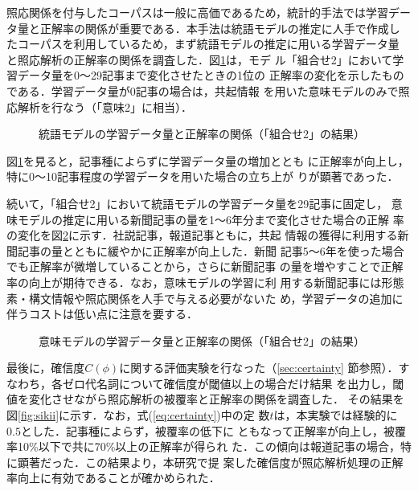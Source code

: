 照応関係を付与したコーパスは一般に高価であるため，統計的手法では学習デー
タ量と正解率の関係が重要である．本手法は統語モデルの推定に人手で作成し
たコーパスを利用しているため，まず統語モデルの推定に用いる学習データ量
と照応解析の正解率の関係を調査した．\mbox{図\ref{fig:shasetu}}は，モデ
ル「組合せ2」において学習データ量を0〜29記事まで変化させたときの1位の
正解率の変化を示したものである．学習データ量が0記事の場合は，共起情報
を用いた意味モデルのみで照応解析を行なう（「意味2」に相当）．

\begin{figure}[htbp]
\begin{center}
  \caption{統語モデルの学習データ量と正解率の関係（「組合せ2」の結果）}
  \label{fig:shasetu}
\end{center}
\end{figure}

図\ref{fig:shasetu}を見ると，記事種によらずに学習データ量の増加ととも
に正解率が向上し，特に0〜10記事程度の学習データを用いた場合の立ち上が
りが顕著であった．

続いて，「組合せ2」において統語モデルの学習データ量を29記事に固定し，
意味モデルの推定に用いる新聞記事の量を1〜6年分まで変化させた場合の正解
率の変化を図\ref{fig:shasetu.k}に示す．社説記事，報道記事ともに，共起
情報の獲得に利用する新聞記事の量とともに緩やかに正解率が向上した．新聞
記事5〜6年を使った場合でも正解率が微増していることから，さらに新聞記事
の量を増やすことで正解率の向上が期待できる．なお，意味モデルの学習に利
用する新聞記事には形態素・構文情報や照応関係を人手で与える必要がないた
め，学習データの追加に伴うコストは低い点に注意を要する．

\begin{figure}[htbp]
\begin{center}
\caption{意味モデルの学習データ量と正解率の関係（「組合せ2」の結果）}
\label{fig:shasetu.k}
\end{center}
\end{figure}


最後に，確信度$C(\phi)$に関する評価実験を行なった（\ref{sec:certainty}
節参照）．すなわち，各ゼロ代名詞について確信度が閾値以上の場合だけ結果
を出力し，閾値を変化させながら照応解析の被覆率と正解率の関係を調査した．
その結果を図\ref{fig:sikii}に示す．なお，式(\ref{eq:certainty})中の定
数$t$は，本実験では経験的に$0.5$とした．記事種によらず，被覆率の低下に
ともなって正解率が向上し，被覆率10\%以下で共に70\%以上の正解率が得られ
た．この傾向は報道記事の場合，特に顕著だった．この結果より，本研究で提
案した確信度が照応解析処理の正解率向上に有効であることが確かめられた．

